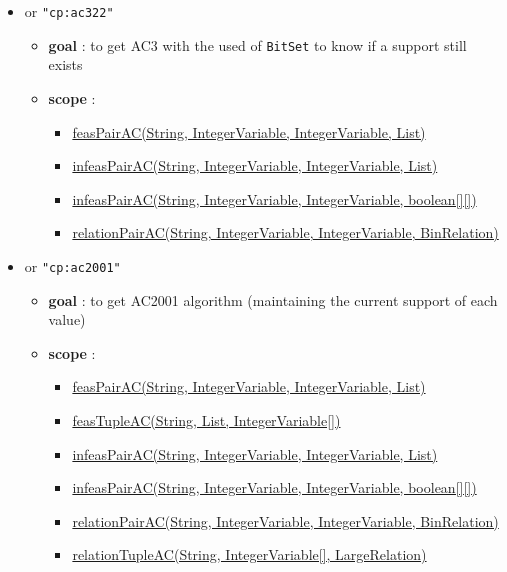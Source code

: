 \begin{itemize}
\begin{itemize}
		\end{itemize}
		\item \label{cext322:cext322options}\hypertarget{cext322:cext322options}{}
		 or \texttt{"cp:ac322"}
		\begin{itemize}
				\item \textbf{goal} : to get AC3 with the used of \texttt{BitSet} to know if a support still exists
				\item \textbf{scope} : 
					\begin{itemize}
						\item \hyperlink{feaspairac:feaspairacconstraint}{feasPairAC(String, IntegerVariable, IntegerVariable, List)}
						\item \hyperlink{infeaspairac:infeaspairacconstraint}{infeasPairAC(String, IntegerVariable, IntegerVariable, List)}					
						\item \hyperlink{infeaspairac:infeaspairacconstraint}{infeasPairAC(String, IntegerVariable, IntegerVariable, boolean[][])}
						\item \hyperlink{relationpairac:relationpairacconstraint}{relationPairAC(String, IntegerVariable, IntegerVariable, BinRelation)}	
					\end{itemize}	

		\end{itemize}	
		\item \label{cext2001:cext2001options}\hypertarget{cext2001:cext2001options}{}			
		 or \texttt{"cp:ac2001"}
		\begin{itemize}
				\item \textbf{goal} : to get AC2001 algorithm (maintaining the current support of each value) 
				\item \textbf{scope} : 
					\begin{itemize}
						\item \hyperlink{feaspairac:feaspairacconstraint}{feasPairAC(String, IntegerVariable, IntegerVariable, List)}
						\item \hyperlink{feastupleac:feastupleacconstraint}{feasTupleAC(String, List, IntegerVariable[])}
						\item \hyperlink{infeaspairac:infeaspairacconstraint}{infeasPairAC(String, IntegerVariable, IntegerVariable, List)}					
						\item \hyperlink{infeaspairac:infeaspairacconstraint}{infeasPairAC(String, IntegerVariable, IntegerVariable, boolean[][])}
						\item \hyperlink{relationpairac:relationpairacconstraint}{relationPairAC(String, IntegerVariable, IntegerVariable, BinRelation)}	
						\item \hyperlink{relationtupleac:relationtupleacconstraint}{relationTupleAC(String, IntegerVariable[], LargeRelation)}
					\end{itemize}	


\end{itemize}
\end{itemize}

